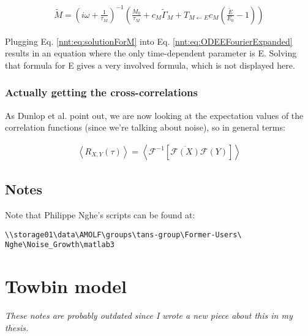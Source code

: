 \begin{align}
\label{nnt:eq:solutionForM}
\tilde{M} = \left( i \omega + \frac{1}{\tau_M} \right)^{-1} \left( \frac{M_0}{\tau_M} + c_M \tilde{\Gamma}_M + T_{M \leftarrow E} c_M (\frac{\tilde{E}}{E_0} - 1) \right)
\end{align}

Plugging Eq. \ref{nnt:eq:solutionForM} into Eq. \ref{nnt:eq:ODEEFourierExpanded} results in an equation where the only time-dependent parameter is E.
Solving that formula for E gives a very involved formula, which is not displayed here.

\subsection*{Actually getting the cross-correlations}

As Dunlop et al. point out, we are now looking at the expectation values of the correlation functions (since we're talking about noise), so in general terms:

\begin{align}
\left< R_{X,Y}(\tau)\right > = 
\left< \mathcal{F}^{-1} \left[ \overline{\mathcal{F} (X)} \mathcal{F}(Y) \right] \right>
\end{align}

\section*{Notes}

Note that Philippe Nghe's scripts can be found at:

\begin{verbatim}
\\storage01\data\AMOLF\groups\tans-group\Former-Users\
Nghe\Noise_Growth\matlab3
\end{verbatim}


\chapter{Towbin model}

\textit{These notes are probably outdated since I wrote a new piece about this in my thesis.}

